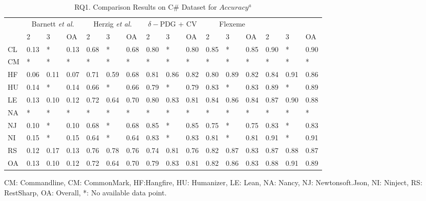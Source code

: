 \begin{table}[t]
	\caption{RQ1. Comparison Results on C\# Dataset for $Accuracy^a$}
	\vspace{-0.1in}
	\begin{center}
		\scriptsize
		\tabcolsep 4pt
		\renewcommand{\arraystretch}{1} \begin{tabular}{p{0.2cm}<{\centering}|p{0.25cm}<{\centering}p{0.25cm}<{\centering}p{0.25cm}<{\centering}|p{0.25cm}<{\centering}p{0.25cm}<{\centering}p{0.25cm}<{\centering}|p{0.25cm}<{\centering}p{0.25cm}<{\centering}p{0.25cm}<{\centering}|p{0.25cm}<{\centering}p{0.25cm}<{\centering}p{0.25cm}<{\centering}|p{0.25cm}<{\centering}p{0.25cm}<{\centering}p{0.25cm}<{\centering}}
			
			\hline
			\multirow{2}{*}{}          & \multicolumn{3}{c|}{Barnett {\em et al.}} & \multicolumn{3}{c|}{Herzig {\em et al.}} & \multicolumn{3}{c|}{$\delta-$PDG + CV} & \multicolumn{3}{c|}{Flexeme} & \multicolumn{3}{c}{\tool}\\
			\cline{2-16}
			& 2 & 3 & OA & 2 & 3 & OA & 2 & 3 & OA & 2 & 3 & OA & 2 & 3 & OA \\
			\hline
			CL   & 0.13 & *    & 0.13 & 0.68 & *    & 0.68 & 0.80 & *    & 0.80 & 0.85 & *    & 0.85 & 0.90 & *    & 0.90 \\
			CM   & *    & *    & *    & *    & *    & *    & *    & *    & *    & *    & *    & *    & *    & *    & *    \\
			HF   & 0.06 & 0.11 & 0.07 & 0.71 & 0.59 & 0.68 & 0.81 & 0.86 & 0.82 & 0.80 & 0.89 & 0.82 & 0.84 & 0.91 & 0.86 \\
			HU   & 0.14 & *    & 0.14 & 0.66 & *    & 0.66 & 0.79 & *    & 0.79 & 0.83 & *    & 0.83 & 0.89 & *    & 0.89 \\
			LE   & 0.13 & 0.10 & 0.12 & 0.72 & 0.64 & 0.70 & 0.80 & 0.83 & 0.81 & 0.84 & 0.86 & 0.84 & 0.87 & 0.90 & 0.88\\
			NA   & *    & *    & *    & *    & *    & *    & *    & *    & *    & *    & *    & *    & *    & *    & *    \\
			NJ   & 0.10 & *    & 0.10 & 0.68 & *    & 0.68 & 0.85 & *    & 0.85 & 0.75 & *    & 0.75 & 0.83 & *    & 0.83 \\
			NI   & 0.15 & *    & 0.15 & 0.64 & *    & 0.64 & 0.83 & *    & 0.83 & 0.81 & *    & 0.81 & 0.91 & *    & 0.91 \\
			RS   & 0.12 & 0.17 & 0.13 & 0.76 & 0.78 & 0.76 & 0.74 & 0.81 & 0.76 & 0.82 & 0.87 & 0.83 & 0.87 & 0.88 & 0.87\\
			\hline
			OA   & 0.13 & 0.10 & 0.12 & 0.72 & 0.64 & 0.70 & 0.79 & 0.83 & 0.81 & 0.82 & 0.86 & 0.83 & 0.88 & 0.91 & 0.89 \\
			\hline
		\end{tabular}
		\label{RQ1-result-2}
		CM: Commandline, CM: CommonMark, HF:Hangfire, HU: Humanizer, LE: Lean, NA: Nancy, NJ: Newtonsoft.Json, NI: Ninject, RS: RestSharp, OA: Overall, *: No available data point.
	\end{center}
\end{table}


